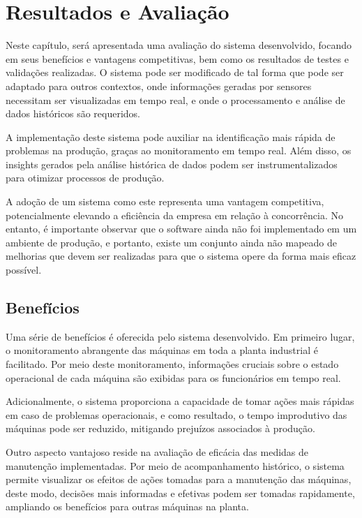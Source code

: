 \chapter{Resultados e Avaliação}\label{cap:results}
Neste capítulo, será apresentada uma avaliação do sistema desenvolvido, focando em seus benefícios e vantagens competitivas, bem como os resultados de testes e validações realizadas. O sistema pode ser modificado de tal forma que pode ser adaptado para outros contextos, onde informações geradas por sensores necessitam ser visualizadas em tempo real, e onde o processamento e análise de dados históricos são requeridos.

A implementação deste sistema pode auxiliar na identificação mais rápida de problemas na produção, graças ao monitoramento em tempo real. Além disso, os insights gerados pela análise histórica de dados podem ser instrumentalizados para otimizar processos de produção. 

A adoção de um sistema como este representa uma vantagem competitiva, potencialmente elevando a eficiência da empresa em relação à concorrência. No entanto, é importante observar que o software ainda não foi implementado em um ambiente de produção, e portanto, existe um conjunto ainda não mapeado de melhorias que devem ser realizadas para que o sistema opere da forma mais eficaz possível.


\section{Benefícios}\label{sec:benfits}

Uma série de benefícios é oferecida pelo sistema desenvolvido. Em primeiro lugar, o monitoramento abrangente das máquinas em toda a planta industrial é facilitado. Por meio deste monitoramento, informações cruciais sobre o estado operacional de cada máquina são exibidas para os funcionários em tempo real.

Adicionalmente, o sistema proporciona a capacidade de tomar ações mais rápidas em caso de problemas operacionais, e como resultado, o tempo improdutivo das máquinas pode ser reduzido, mitigando prejuízos associados à produção.

Outro aspecto vantajoso reside na avaliação de eficácia das medidas de manutenção implementadas. Por meio de acompanhamento histórico, o sistema permite visualizar os efeitos de ações tomadas para a manutenção das máquinas, deste modo, decisões mais informadas e efetivas podem ser tomadas rapidamente, ampliando os benefícios para outras máquinas na planta.

